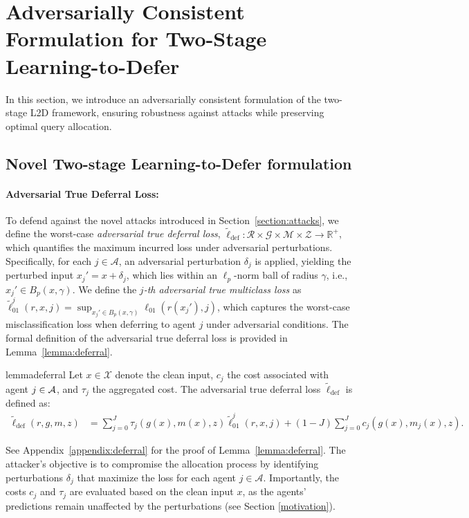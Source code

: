\section{Adversarially Consistent Formulation for Two-Stage Learning-to-Defer}

In this section, we introduce an adversarially consistent formulation of the two-stage L2D framework, ensuring robustness against attacks while preserving optimal query allocation.




\subsection{Novel Two-stage Learning-to-Defer formulation}

\paragraph{Adversarial True Deferral Loss:} 


To defend against the novel attacks introduced in Section~\ref{section:attacks}, we define the worst-case \textit{adversarial true deferral loss}, \( \widetilde{\ell}_{\text{def}}: \mathcal{R} \times \mathcal{G} \times \mathcal{M} \times \mathcal{Z} \to \mathbb{R}^+ \), which quantifies the maximum incurred loss under adversarial perturbations. Specifically, for each \( j \in \mathcal{A} \), an adversarial perturbation \( \delta_j \) is applied, yielding the perturbed input \( x_j' = x + \delta_j \), which lies within an \(\ell_p\)-norm ball of radius \(\gamma\), i.e., \( x_j' \in B_p(x, \gamma) \). We define the \textit{\( j \)-th adversarial true multiclass loss} as  $\widetilde{\ell}_{01}^j(r,x,j) = \sup_{x_j' \in B_p(x, \gamma)} \ell_{01}(r(x_j'), j)$, which captures the worst-case misclassification loss when deferring to agent \( j \) under adversarial conditions. The formal definition of the adversarial true deferral loss is provided in Lemma~\ref{lemma:deferral}.

\begin{restatable}{lemma}{deferral} \label{lemma:deferral}
Let \( x \in \mathcal{X} \) denote the clean input, \( c_j \) the cost associated with agent \( j\in\mathcal{A} \), and \( \tau_j \) the aggregated cost. The adversarial true deferral loss \( \widetilde{\ell}_{\text{def}} \) is defined as:
    \begin{equation*}
    \begin{aligned}
    \widetilde{\ell}_{\text{def}}(r, g, m, z) & = \sum_{j=0}^J \tau_j(g(x), m(x), z) \widetilde{\ell}_{01}^j(r,x,j)  + (1 - J) \sum_{j=0}^J c_j(g(x), m_j(x), z).
        \end{aligned}
    \end{equation*}
\end{restatable}
See Appendix~\ref{appendix:deferral} for the proof of Lemma~\ref{lemma:deferral}. The attacker’s objective is to compromise the allocation process by identifying perturbations \( \delta_j \) that maximize the loss for each agent \( j \in \mathcal{A} \). Importantly, the costs \( c_j \) and \( \tau_j \) are evaluated based on the clean input \( x \), as the agents' predictions remain unaffected by the perturbations (see Section \ref{motivation}).


